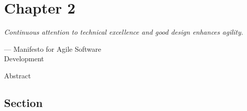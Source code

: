 \setlength{\headheight}{1.2cm}
\renewcommand{\publ}{\flushleft\footnotesize{Based on:\\[0.1cm]
		\textit{``Title''} \\[0.1cm]
}}

\chapter{Chapter 2}
\label{chap:2}
\epigraph{\emph{Continuous attention to technical excellence
and good design enhances agility.}}{--- Manifesto for  Agile Software\\Development}


\begin{Abstract}
Abstract
\end{Abstract}

\section{Section}
\label{sec:2.1}
